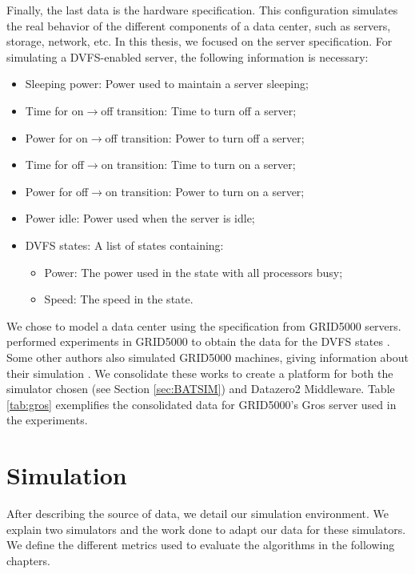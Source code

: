 Finally, the last data is the hardware specification. This configuration simulates the real behavior of the different components of a data center, such as servers, storage, network, etc. In this thesis, we focused on the server specification. For simulating a DVFS-enabled server, the following information is necessary:
\begin{itemize}
    \item Sleeping power: Power used to maintain a server sleeping;
    \item Time for on\(\rightarrow\)off transition: Time to turn off a server;
    \item Power for on\(\rightarrow\)off transition: Power to turn off a server;
    \item Time for off\(\rightarrow\)on transition: Time to turn on a server;
    \item Power for off\(\rightarrow\)on transition: Power to turn on a server;
    \item Power idle: Power used when the server is idle;
    \item DVFS states: A list of states containing:
    \begin{itemize}
        \item Power: The power used in the state with all processors busy;
        \item Speed: The speed in the state.
    \end{itemize}
\end{itemize}

We chose to model a data center using the specification from GRID5000 servers. \citeauthor{dacosta:hal-03453537v1} performed experiments in GRID5000 to obtain the data for the DVFS states \cite{dacosta:hal-03453537v1, dacostakeynote}. Some other authors also simulated GRID5000 machines, giving information about their simulation \cite{rais2018quantifying, caux2018optimization, caux2019phase, villebonnet2016energy}. We consolidate these works to create a platform for both the simulator chosen (see Section \ref{sec:BATSIM}) and Datazero2 Middleware. Table \ref{tab:gros} exemplifies the consolidated data for GRID5000's Gros server used in the experiments.



\section{Simulation}
\label{sec:simulation}

After describing the source of data, we detail our simulation environment. We explain two simulators and the work done to adapt our data for these simulators. We define the different metrics used to evaluate the algorithms in the following chapters.


